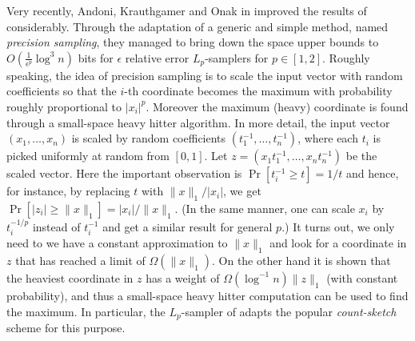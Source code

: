 \documentclass[9pt,letterpaper]{article}
\theoremstyle{remark}
\DeclareMathOperator*{\E}{\mathbb{E}}
\begin{document}
  Very recently, Andoni, Krauthgamer and Onak in %
\cite{AndoniKO10} improved the results of \cite{MonemizadehW10} 
 considerably. Through the adaptation of %
  a generic and simple method, named {\it precision sampling}, they managed
   to bring down the space upper bounds to $O(\frac1{\epsilon^p}\log^3 n)$ bits
   for $\epsilon$ relative error $L_p$-samplers for $p \in [1,2]$. Roughly speaking, the idea of precision
  sampling is to scale the input vector with random coefficients so that the $i$-th coordinate
  becomes the maximum with probability roughly proportional to $|x_i|^p$. Moreover the maximum (heavy)
   coordinate is found through a small-space heavy hitter algorithm. In more detail,
    the input vector $(x_1,\ldots,x_n)$ is scaled 
   by random coefficients $(t_1^{-1},\ldots,t_n^{-1})$, where each $t_i$ is picked uniformly 
   at random from $[0,1]$. Let $z=(x_1t_1^{-1},\ldots,x_nt_n^{-1})$ be the 
   scaled vector. %
 Here the 
   important observation is $\Pr[t_i^{-1} \ge t] =1/t$ 
   and hence, for instance,  by replacing $t$ with 
   $\|x\|_1/|x_i|$, we get $\Pr[|z_i| \ge \|x\|_1] = |x_i|/\|x\|_1$. (In the
   same manner, one can scale $x_i$ by $t_i^{-1/p}$
   instead of $t_i^{-1}$ and get a similar result for general $p$.) %
It turns out, we only need to we have a constant approximation to
$\|x\|_1$ and look for a coordinate in $z$ that has reached a
   limit of $\Omega(\|x\|_1)$. On the other hand it is shown that the heaviest coordinate in $z$ has
   a weight of $\Omega(\log^{-1}{n})\|z\|_1$ (with constant probability), and thus
   a small-space heavy hitter computation can be used to find the maximum. In particular, 
   the $L_p$-sampler of \cite{AndoniKO10} adapts the
   popular {\it count-sketch} scheme \cite{CharikarCF04} for this purpose.
\end{document}
